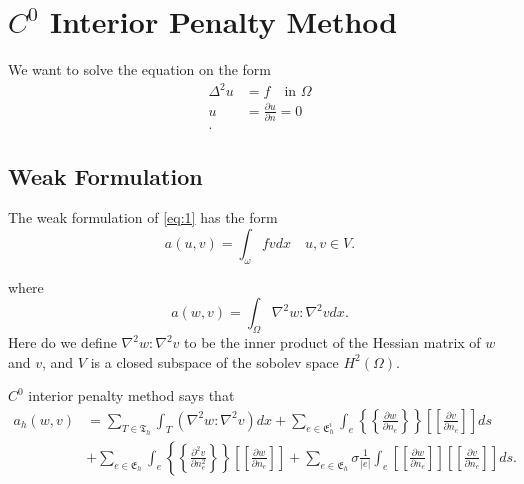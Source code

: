 \section{$C^0$ Interior Penalty Method}\label{sec:ch1}


We want to solve the equation on the form
\begin{align}
    \label{eq:1}
    \Delta ^{2} u &= f \quad \text{in } \Omega  \\
    u &= \frac{\partial u}{\partial n} = 0  \\
.\end{align}

\subsection{Weak Formulation}%
\label{sub:weak_formulation}


The weak formulation of \eqref{eq:1} has the form
\begin{equation}
\label{eq:2}
    a\left( u,v \right) = \int_{\omega}^{} f v dx \quad u,v \in V
.\end{equation}

where
\begin{equation}
\label{eq:3}
    a\left( w,v \right) = \int_{\Omega }^{} \nabla ^2 w : \nabla ^2 v dx
.\end{equation}
Here do we define $\nabla ^2 w : \nabla ^2 v $ to be the inner product of the Hessian matrix of $w$  and $v$, and $V$
is a closed subspace of the sobolev space $H^2\left( \Omega  \right)$.

$C^{0}$ interior penalty method says that
\begin{align*}
    a_{h} \left( w,v \right) &= \sum_{T \in \mathfrak{T}_h      }^{ } \int_{T}^{} \left( \nabla ^2 w : \nabla ^2 v
    \right) dx  + \sum_{e \in \mathfrak{E}_{h}^{i} }^{} \int_{e}^{} \left\{\!\!\!\left\{ \frac{\partial w}{\partial n_{e}} \right\}\!\!\!\right\}
   \left[\!\!\left[ \frac{\partial v}{\partial n_{e}} \right]\!\!\right] ds  \\
   & +  \sum_{e \in \mathfrak{E} _{h}}^{}
   \int_{e}^{} \left\{\!\!\!\left\{ \frac{\partial ^2 v}{\partial n_e^{2} } \right\}\!\!\!\right\} \left[\!\!\left[
   \frac{\partial w }{\partial n_{e}} \right]\!\!\right] + \sum_{e \in \mathfrak{E} _{h}}^{} \sigma \frac{1}{\left\lvert
e \right\rvert }  \int_{e}^{} \left[\!\!\left[ \frac{\partial w}{\partial n_{e}} \right]\!\!\right] \left[\!\!\left[
\frac{\partial v }{\partial n_{e}} \right]\!\!\right]     ds
.\end{align*}








